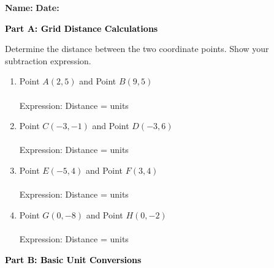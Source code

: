 \documentclass[12pt, letterpaper, fleqn]{article}
\newcommand{\blank}{\underline{\hspace{2.2cm}}}
\newcommand{\blanklong}{\underline{\hspace{6.5cm}}}
\begin{document}
\textbf{Name:} \underline{\hspace{5cm}}
\hfill
\textbf{Date:} \underline{\hspace{3cm}}\\

\begin{tcolorbox}[colback=black!10]
    \large\textcolor{black}{\textbf{Part A: Grid Distance Calculations}}
\end{tcolorbox}

\vspace{3mm}

\noindent
Determine the distance between the two coordinate points. Show your subtraction expression.

\vspace{5mm}

\begin{enumerate}[itemsep=2.3cm, leftmargin=0.6cm]
\item Point $A(2, 5)$ and Point $B(9, 5)$ \\ \\
Expression: \blanklong \quad Distance = \blank units

\item Point $C(-3, -1)$ and Point $D(-3, 6)$ \\ \\
Expression: \blanklong \quad Distance = \blank units

\item Point $E(-5, 4)$ and Point $F(3, 4)$ \\ \\
Expression: \blanklong \quad Distance = \blank units

\item Point $G(0, -8)$ and Point $H(0, -2)$ \\ \\
Expression: \blanklong \quad Distance = \blank units
\end{enumerate}

\newpage

\begin{tcolorbox}[colback=black!10]
    \large\textcolor{black}{\textbf{Part B: Basic Unit Conversions}}
\end{tcolorbox}
\end{document}
